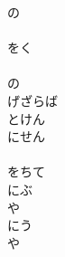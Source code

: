 \documentclass[10pt,b5j]{tarticle} %
\begin{document}
\begin{enumerate}
\begin{minipage}[c]{\blocksize}
        \vspace{\linespace}
        \item
        の\\
        \\
        をく\\
        \\
        の\\
        げざらば\\
        とけん\\
        にせん\\
        \\
        をちて\\
        にぶ\\
        や\\
        にう\\
        や
    
    \end{minipage}
\end{enumerate} %
\end{document}
